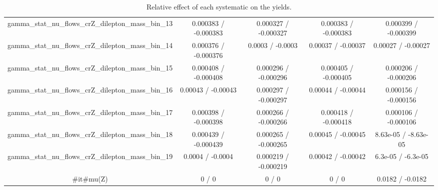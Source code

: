 \documentclass[10pt]{article}
\begin{document}
\begin{table}[htbp]
\begin{center}
\begin{tabular}{|c|c|c|c|c|}
  gamma_stat_nu_flows_crZ_dilepton_mass_bin_13 & 0.000383 / -0.000383 & 0.000327 / -0.000327 & 0.000383 / -0.000383 & 0.000399 / -0.000399 \\ 
  gamma_stat_nu_flows_crZ_dilepton_mass_bin_14 & 0.000376 / -0.000376 & 0.0003 / -0.0003 & 0.00037 / -0.00037 & 0.00027 / -0.00027 \\ 
  gamma_stat_nu_flows_crZ_dilepton_mass_bin_15 & 0.000408 / -0.000408 & 0.000296 / -0.000296 & 0.000405 / -0.000405 & 0.000206 / -0.000206 \\ 
  gamma_stat_nu_flows_crZ_dilepton_mass_bin_16 & 0.00043 / -0.00043 & 0.000297 / -0.000297 & 0.00044 / -0.00044 & 0.000156 / -0.000156 \\ 
  gamma_stat_nu_flows_crZ_dilepton_mass_bin_17 & 0.000398 / -0.000398 & 0.000266 / -0.000266 & 0.000418 / -0.000418 & 0.000106 / -0.000106 \\ 
  gamma_stat_nu_flows_crZ_dilepton_mass_bin_18 & 0.000439 / -0.000439 & 0.000265 / -0.000265 & 0.00045 / -0.00045 & 8.63e-05 / -8.63e-05 \\ 
  gamma_stat_nu_flows_crZ_dilepton_mass_bin_19 & 0.0004 / -0.0004 & 0.000219 / -0.000219 & 0.00042 / -0.00042 & 6.3e-05 / -6.3e-05 \\ 
  #it{#mu}(Z) & 0 / 0 & 0 / 0 & 0 / 0 & 0.0182 / -0.0182 \\ 
\hline 
\end{tabular} 
\caption{Relative effect of each systematic on the yields.} 
\end{center} 
\end{table} 
\end{document}
